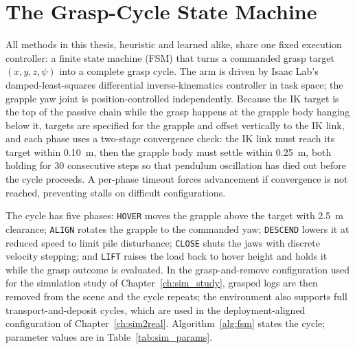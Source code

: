 \section{The Grasp-Cycle State Machine}
\label{sec:sim_fsm}

All methods in this thesis, heuristic and learned alike, share one fixed
execution controller: a finite state machine (FSM) that turns a commanded
grasp target $(x, y, z, \psi)$ into a complete grasp cycle. The arm is driven
by Isaac Lab's damped-least-squares differential inverse-kinematics
controller in task space; the grapple yaw joint is position-controlled
independently. Because the IK target is the top of the passive chain while
the grasp happens at the grapple body hanging below it, targets are specified
for the grapple and offset vertically to the IK link, and each phase uses a
two-stage convergence check: the IK link must reach its target within
0.10~m, then the grapple body must settle within 0.25~m, both holding for 30
consecutive steps so that pendulum oscillation has died out before the cycle
proceeds. A per-phase timeout forces advancement if convergence is not
reached, preventing stalls on difficult configurations.

The cycle has five phases: \texttt{HOVER} moves the grapple above the target
with 2.5~m clearance; \texttt{ALIGN} rotates the grapple to the commanded
yaw; \texttt{DESCEND} lowers it at reduced speed to limit pile disturbance;
\texttt{CLOSE} shuts the jaws with discrete velocity stepping; and
\texttt{LIFT} raises the load back to hover height and holds it while the
grasp outcome is evaluated. In the grasp-and-remove configuration used for
the simulation study of Chapter~\ref{ch:sim_study}, grasped logs are then
removed from the scene and the cycle repeats; the environment also supports
full transport-and-deposit cycles, which are used in the deployment-aligned
configuration of Chapter~\ref{ch:sim2real}.
Algorithm~\ref{alg:fsm} states the cycle; parameter values are in
Table~\ref{tab:sim_params}.

